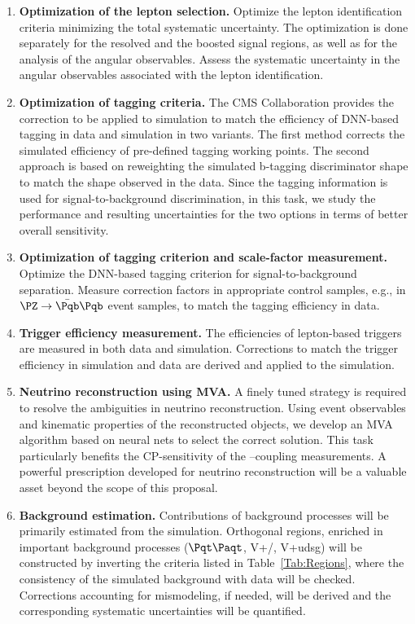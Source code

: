 \documentclass[a4paper,11pt]{article}
\newcommand{\Pb}{{{\Pqb}}\xspace}
\newcommand{\Pt}{{{\Pqt}}\xspace}
\newcommand{\Pc}{{{\Pqc}}\xspace}
\newcommand{\PAt}{{{{\Paqt}}}\xspace}
\renewcommand{\PV}{{{{V}}}\xspace}
\begin{document}
\begin{enumerate}[noitemsep,topsep=0pt]
\item {\bf Optimization of the lepton selection.} Optimize the lepton identification criteria minimizing the total systematic uncertainty. The optimization is done separately for the resolved and the boosted signal regions, as well as for the analysis of the angular observables.
Assess the systematic uncertainty in the angular observables associated with the lepton identification.

\item {\bf Optimization of \Pb tagging criteria.} 
The CMS Collaboration provides the correction to be applied to simulation to match the efficiency of DNN-based \Pb tagging in data and simulation in two variants. 
The first method corrects the simulated efficiency of pre-defined  \Pb tagging working points. 
The second approach is based on reweighting the simulated b-tagging discriminator shape to match the shape observed in the data.
Since the \Pb tagging information is used for signal-to-background discrimination, in this task, we study the performance and resulting uncertainties for the two options in terms of better overall sensitivity.

\item {\bf Optimization of \PH tagging criterion and scale-factor measurement.} Optimize the DNN-based \PH tagging criterion for signal-to-background separation. 
Measure correction factors in appropriate control samples, e.g., in $\PZ\rightarrow\bar \Pqb\Pqb$ event samples, to match the tagging efficiency in data.

\item {\bf Trigger efficiency measurement.} The efficiencies of lepton-based triggers are measured in both data and simulation. 
Corrections to match the trigger efficiency in simulation and data are derived and applied to the simulation. 

\item {\bf Neutrino reconstruction using MVA.}
A finely tuned strategy is required to resolve the ambiguities in neutrino reconstruction. 
Using event observables and kinematic properties of the reconstructed objects, we develop an MVA algorithm based on neural nets to select the correct solution. 
This task particularly benefits the CP-sensitivity of the \PH--\PW coupling measurements. 
A powerful prescription developed for neutrino reconstruction will be a valuable asset beyond the scope of this proposal.

\item {\bf Background estimation.} 
Contributions of background processes will be primarily estimated from the simulation. Orthogonal regions, enriched in important background processes ($\Pt\PAt$, {\PV}+\Pb/\Pc, {\PV}+udsg) will be constructed by inverting the criteria listed in Table~\ref{Tab:Regions}, where the consistency of the simulated background with data will be checked. 
Corrections accounting for mismodeling, if needed, will be derived and the corresponding systematic uncertainties will be quantified. 


\end{enumerate}
\end{document}
